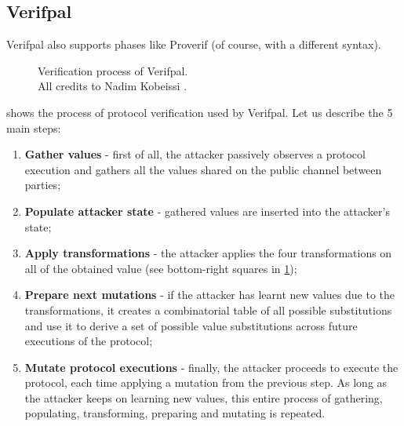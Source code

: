 
\subsection{Verifpal}


Verifpal also supports phases like Proverif (of course, with a different syntax).

\begin{figure}[t]
    \centering
    \caption{Verification process of Verifpal.\\ All credits to Nadim Kobeissi \cite{VerifpalManual}.}
    \label{fig:verifpal-verification}
\end{figure}

 shows the process of protocol verification used by Verifpal. Let us describe the 5 main steps:

\begin{enumerate}
    \item{\textbf{Gather values} - first of all, the attacker passively observes a protocol execution and gathers all the values shared on the public channel between parties;}
    \item{\textbf{Populate attacker state} - gathered values are inserted into the attacker's state;}
    \item{\textbf{Apply transformations} - the attacker applies the four transformations on all of the obtained value (see bottom-right squares in \cref{fig:verifpal-verification});}
    \item{\textbf{Prepare next mutations} - if the attacker has learnt new values due to the transformations, it creates a combinatorial table of all possible substitutions and use it to derive a set of possible value substitutions across future executions of the protocol;}
    \item{\textbf{Mutate protocol executions} - finally, the attacker proceeds to execute the protocol, each time applying a mutation from the previous step. As long as the attacker keeps on learning new values, this entire process of gathering, populating, transforming, preparing and mutating is repeated.}
\end{enumerate}

